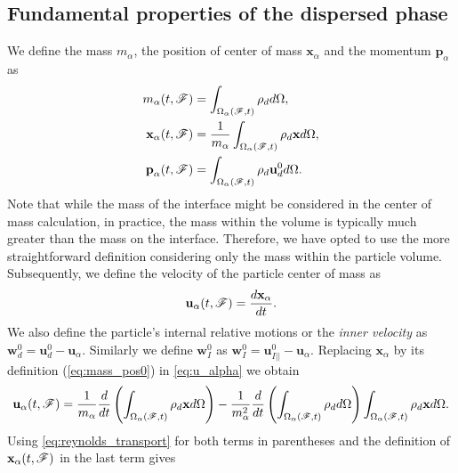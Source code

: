 \documentclass[11pt]{My_preprint}
\providecommand{\DIFaddbegin}{} %
\providecommand{\DIFaddend}{} %
\providecommand{\DIFdelbegin}{} %
\providecommand{\DIFdelend}{} %
\begin{document}
 \subsection{Fundamental properties of the dispersed phase}
We define the mass $m_\alpha$, the position of center of mass $\mathbf{x}_\alpha$ and the momentum $\textbf{p}_\alpha$ as
\begin{align}
    m_\alpha(t,\FF)
    &= \DIFdelbegin %
\DIFdelend \DIFaddbegin \intOF{ \rho_d  }\DIFaddend , 
    \\
    \textbf{x}_\alpha(t,\FF)
    &= \frac{1}{m_\alpha }\DIFdelbegin %
\DIFdelend \DIFaddbegin \intOF{ \rho_d \textbf{x} }     \DIFaddend \label{eq:mass_pos0},
    \\ \textbf{p}_\alpha(t,\FF)
    &= \DIFdelbegin %
\DIFdelend \DIFaddbegin \intOF{ \rho_d \textbf{u}_d^0 }\DIFaddend .
\end{align}
Note that while the mass of the interface might be considered in the center of mass calculation, in practice, the mass within the volume is typically much greater than the mass on the interface. 
Therefore, we have opted to use the more straightforward definition considering only the mass within the particle volume.
Subsequently, we define the velocity of the particle center of mass as
\begin{equation}
\textbf{u}_\alpha(t,\FF) = \frac{d \textbf{x}_\alpha}{dt}.
\label{eq:u_alpha}
\end{equation}
We also define the particle's internal relative motions or the \textit{inner velocity}  as $\textbf{w}_d^0 = \textbf{u}_d^0 - \textbf{u}_\alpha$. 
Similarly we define $\textbf{w}_I^0$ as $\textbf{w}_I^0 = \textbf{u}_{I||}^0 - \textbf{u}_\alpha$.
Replacing $\textbf{x}_\alpha$ by its definition (\ref{eq:mass_pos0}) in \ref{eq:u_alpha} we obtain
\begin{equation}
    \textbf{u}_\alpha(t,\FF) = \frac{1}{m_\alpha}
    \frac{d}{dt} 
    \left(
        \DIFdelbegin %
\DIFdelend \DIFaddbegin \intOF{ \rho_d \textbf{x} }
    \DIFaddend \right)
    - \frac{1}{m_\alpha^2} \frac{d}{dt} \left(\DIFdelbegin %
\DIFdelend \DIFaddbegin \intOF{ \rho_d } \DIFaddend \right)
    \DIFdelbegin %
\DIFdelend \DIFaddbegin \intOF{ \rho_d \textbf{x} }\DIFaddend .
\end{equation}
Using \ref{eq:reynolds_transport} for both terms in parentheses and the definition of $\textbf{x}_\alpha(t,\mathscr{F})$ in the last term gives
\end{document}
